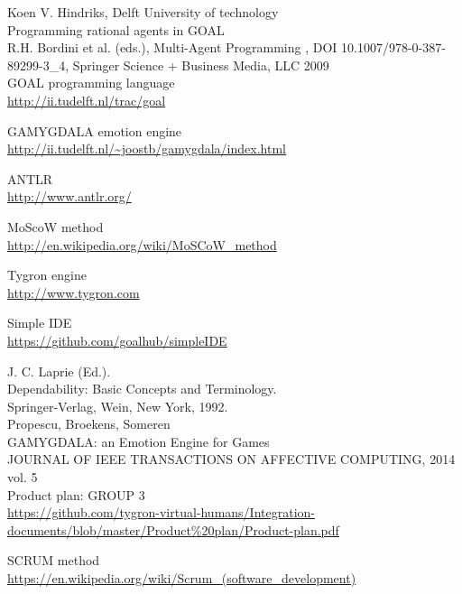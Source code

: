 \documentclass[11pt]{article}
\begin{document}
\clearpage

\printglossaries

\clearpage

\begin{thebibliography}{9}
	Koen V. Hindriks, Delft University of technology\\
	Programming rational agents in GOAL\\
	R.H. Bordini et al. (eds.), Multi-Agent Programming , DOI 10.1007/978-0-387-89299-3\_4, Springer Science + Business Media, LLC 2009 \\

	GOAL programming language\\
	\url{http://ii.tudelft.nl/trac/goal}
	
	GAMYGDALA emotion engine\\
	\url{http://ii.tudelft.nl/~joostb/gamygdala/index.html}
	
	ANTLR\\
	\url{http://www.antlr.org/}
	
	MoScoW method\\
	\url{http://en.wikipedia.org/wiki/MoSCoW_method}
	
	Tygron engine\\
	\url{http://www.tygron.com}
	
	Simple IDE\\
	\url{https://github.com/goalhub/simpleIDE}
	
	J. C. Laprie (Ed.).\\ 
	Dependability: Basic Concepts and Terminology. \\
	Springer-Verlag, Wein, New York, 1992.\\

	Propescu, Broekens, Someren\\
	GAMYGDALA: an Emotion Engine for Games\\
	JOURNAL OF IEEE TRANSACTIONS ON AFFECTIVE COMPUTING, 2014 vol. 5\\

	Product plan: GROUP 3\\
	\url{https://github.com/tygron-virtual-humans/Integration-documents/blob/master/Product\%20plan/Product-plan.pdf}
	
	SCRUM method\\
	\url{https://en.wikipedia.org/wiki/Scrum_(software_development)}
	

\end{thebibliography}
\end{document}
